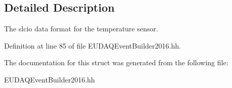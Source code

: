 \subsection{Detailed Description}
The slcio data format for the temperature sensor. 

Definition at line 85 of file E\-U\-D\-A\-Q\-Event\-Builder2016.\-hh.



The documentation for this struct was generated from the following file\-:\begin{DoxyCompactItemize}
\item 
E\-U\-D\-A\-Q\-Event\-Builder2016.\-hh\end{DoxyCompactItemize}
